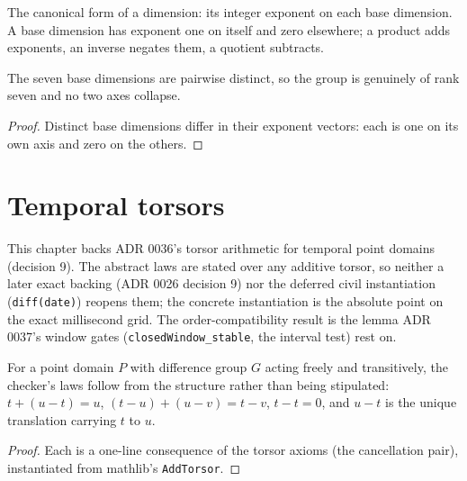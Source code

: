 \begin{definition}
  \label{def:dimension-exponents}\leanok
  The canonical form of a dimension: its integer exponent on each base
  dimension.  A base dimension has exponent one on itself and zero elsewhere;
  a product adds exponents, an inverse negates them, a quotient subtracts.
\end{definition}

\begin{theorem}
  \label{thm:dimension-base-injective}
  \leanok
  The seven base dimensions are pairwise distinct, so the group is genuinely
  of rank seven and no two axes collapse.
\end{theorem}
\begin{proof}\leanok
  Distinct base dimensions differ in their exponent vectors: each is one on
  its own axis and zero on the others.
\end{proof}

\chapter{Temporal torsors}

This chapter backs ADR 0036's torsor arithmetic for temporal point
domains (decision 9).  The abstract laws are stated over any additive
torsor, so neither a later exact backing (ADR 0026 decision 9) nor the
deferred civil instantiation (\texttt{diff(date)}) reopens them; the
concrete instantiation is the absolute point on the exact millisecond
grid.  The order-compatibility result is the lemma ADR 0037's window
gates (\texttt{closedWindow\_stable}, the interval test) rest on.

\begin{theorem}
  \label{thm:torsor-laws}
  \leanok
  For a point domain $P$ with difference group $G$ acting freely and
  transitively, the checker's laws follow from the structure rather than
  being stipulated: $t + (u - t) = u$, $(t - u) + (u - v) = t - v$,
  $t - t = 0$, and $u - t$ is the unique translation carrying $t$ to $u$.
\end{theorem}
\begin{proof}\leanok
  Each is a one-line consequence of the torsor axioms (the cancellation
  pair), instantiated from mathlib's \texttt{AddTorsor}.
\end{proof}

